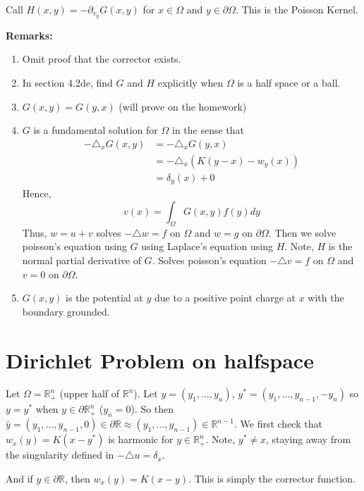 \documentclass{article}
\newtheorem{one minute paper}[theorem]{One Minute Paper}
\begin{document}
Call $H(x,y) = -\partial_{v_y} G(x,y)$ for $x \in \Omega$ and $y \in \partial \Omega$. This is the Poisson Kernel. 

\textbf{Remarks:}
\begin{enumerate}
    \item Omit proof that the corrector exists. 
    \item In section 4.2de, find $G$ and $H$ explicitly when $\Omega$ is a half space or a ball. 
    \item $G(x,y) = G(y,x)$ (will prove on the homework)
    \item $G$ is a fundamental solution for $\Omega$ in the sense that 
    \begin{align*}
        -\triangle_x G(x,y) &= -\triangle_x G(y,x)\\
        &= -\triangle_x (K(y-x) - w_y(x)) \\
        &= \delta_y(x) + 0
    \end{align*}
    Hence, 
    \begin{equation}
        v(x) = \int_{\Omega}G(x,y)f(y)dy
    \end{equation} 
Thus, $w = u + v$ solves $-\triangle w = f$ on $\Omega$ and $w = g$ on $\partial \Omega$. Then we solve poisson's equation using $G$ using Laplace's equation using $H$. Note, $H$ is the normal partial derivative of $G$. 
    Solves poisson's equation $-\triangle v = f$ on $\Omega$ and $v=0$ on $\partial \Omega$. 
    \item $G(x,y)$ is the potential at $y$ due to a positive point charge at $x$ with the boundary grounded. 
\end{enumerate}

\section*{Dirichlet Problem on halfspace}

Let $\Omega = \mathbb{R}^{n}_{+}$ (upper half of $\mathbb{R}^n$). Let $y = (y_1, \dots, y_n)$, $y^* = (y_1, \dots, y_{n-1}, -y_n)$ so $y = y^*$ when $y \in \partial \mathbb{R}^{n}_{+}$ ($y_n = 0$). So then 
$\hat{y} = (y_1, \dots, y_{n-1}, 0) \in \partial \mathbb{R} \approx (y_1, \dots, y_{n-1}) \in \mathbb{R}^{n-1}$. We first check that $w_x(y) = K(x-y^*)$ is harmonic for $y \in \mathbb{R}_{+}^{n}$. Note, $y^{*} \neq x$, staying away from the singularity defined in $-\triangle u = \delta_x$.

And if $y \in \partial \mathbb{R}$, then $w_x(y) = K(x-y)$. This is simply the corrector function. 
\end{document}
